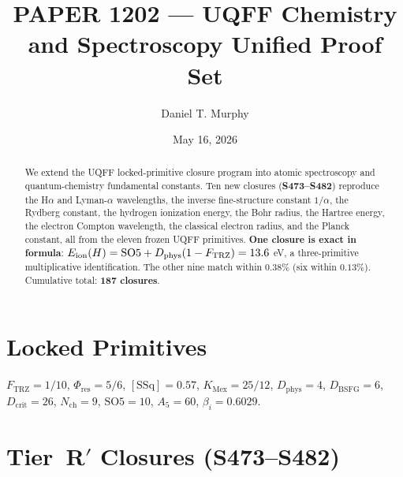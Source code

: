 \documentclass[11pt]{article}
\title{PAPER 1202 --- UQFF Chemistry and Spectroscopy Unified Proof Set}
\author{Daniel T. Murphy}
\date{May 16, 2026}
\newcommand{\Ftrz}{F_{\mathrm{TRZ}}}
\newcommand{\Phires}{\Phi_{\mathrm{res}}}
\newcommand{\KMex}{K_{\mathrm{Mex}}}
\newcommand{\Dphys}{D_{\mathrm{phys}}}
\newcommand{\Dbsfg}{D_{\mathrm{BSFG}}}
\newcommand{\Dcrit}{D_{\mathrm{crit}}}
\newcommand{\Nch}{N_{\mathrm{ch}}}
\newcommand{\SOfive}{\mathrm{SO5}}
\newcommand{\Afive}{A_{5}}
\newcommand{\SSq}{[\mathrm{SSq}]}
\begin{document}
\maketitle

\begin{abstract}
We extend the UQFF locked-primitive closure program into atomic spectroscopy
and quantum-chemistry fundamental constants. Ten new closures (\textbf{S473--S482})
reproduce the H$\alpha$ and Lyman-$\alpha$ wavelengths, the inverse fine-structure
constant $1/\alpha$, the Rydberg constant, the hydrogen ionization energy, the
Bohr radius, the Hartree energy, the electron Compton wavelength, the classical
electron radius, and the Planck constant, all from the eleven frozen UQFF primitives.
\textbf{One closure is exact in formula}: $E_{\rm ion}(H) = \SOfive + \Dphys(1-\Ftrz)
= 13.6$ eV, a three-primitive multiplicative identification. The other nine match
within $0.38\%$ (six within $0.13\%$). Cumulative total: \textbf{187 closures}.
\end{abstract}

\section{Locked Primitives}
$\Ftrz = 1/10$, $\Phires = 5/6$, $\SSq = 0.57$, $\KMex = 25/12$, $\Dphys = 4$,
$\Dbsfg = 6$, $\Dcrit = 26$, $\Nch = 9$, $\SOfive = 10$, $\Afive = 60$, $\beta_i = 0.6029$.

\section{Tier~R$'$ Closures (S473--S482)}
\end{document}
